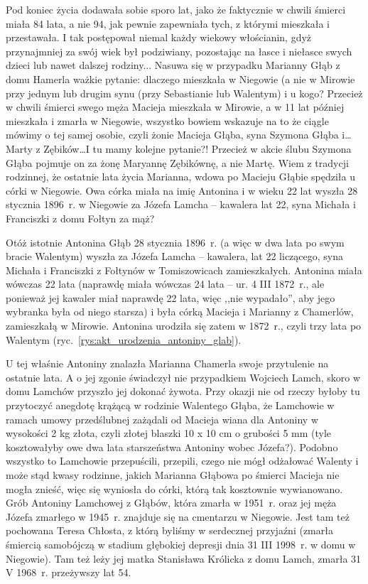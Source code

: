 Pod koniec życia dodawała sobie sporo lat, jako że faktycznie w chwili śmierci miała 84 lata, a nie 94, jak pewnie zapewniała tych, z którymi mieszkała i przestawała. I tak postępował niemal każdy wiekowy włościanin, gdyż przynajmniej za swój wiek był podziwiany, pozostając na łasce i niełasce swych dzieci lub nawet dalszej rodziny... Nasuwa się w przypadku Marianny Głąb z domu Hamerla ważkie pytanie: dlaczego mieszkała w Niegowie (a nie w Mirowie przy jednym lub drugim synu (przy Sebastianie lub Walentym) i u kogo? Przecież w chwili śmierci swego męża Macieja mieszkała w Mirowie, a w 11 lat później mieszkała i zmarła w Niegowie, wszystko bowiem wskazuje na to że ciągle mówimy o tej samej osobie, czyli żonie Macieja Głąba, syna Szymona Głąba i\ldots Marty z Zębików\ldots I tu mamy kolejne pytanie?! Przecież w akcie ślubu Szymona Głąba pojmuje on za żonę Maryannę Zębikównę, a nie Martę. Wiem z tradycji rodzinnej, że ostatnie lata życia Marianna, wdowa po Macieju Głąbie spędziła u córki w Niegowie. Owa córka miała na imię Antonina i w wieku 22 lat wyszła 28 stycznia 1896~r. w Niegowie za Józefa Lamcha -- kawalera lat 22, syna Michała i Franciszki z domu Fołtyn za mąż?


Otóż istotnie Antonina Głąb 28 stycznia 1896~r. (a więc w dwa lata po swym bracie Walentym) wyszła za Józefa Lamcha – kawalera, lat 22 liczącego, syna Michała i Franciszki z Fołtynów w Tomiszowicach zamieszkałych. Antonina miała wówczas 22 lata (naprawdę miała wówczas 24 lata -- ur. 4 III 1872~r., ale ponieważ jej kawaler miał naprawdę 22 lata, więc ,,nie wypadało'', aby jego wybranka była od niego starsza) i była córką Macieja i Marianny z Chamerlów, zamieszkałą w Mirowie. Antonina urodziła się zatem w 1872~r., czyli trzy lata po Walentym (ryc.~\ref{rys:akt_urodzenia_antoniny_glab}).

U tej właśnie Antoniny znalazła Marianna Chamerla swoje przytulenie na ostatnie lata. A o jej zgonie świadczył nie przypadkiem Wojciech Lamch, skoro w domu Lamchów przyszło jej dokonać żywota. 
Przy okazji nie od rzeczy byłoby tu przytoczyć anegdotę krążącą w rodzinie Walentego Głąba, że Lamchowie w ramach umowy przedślubnej zażądali od Macieja wiana dla Antoniny w wysokości 2 kg złota, czyli złotej blaszki 10 x 10 cm o grubości 5 mm (tyle kosztowałyby owe dwa lata starszeństwa Antoniny wobec Józefa?).  Podobno wszystko to Lamchowie przepuścili, przepili, czego nie mógł odżałować Walenty i może stąd kwasy rodzinne, jakich Marianna Głąbowa po śmierci Macieja nie mogła znieść, więc się wyniosła do córki, którą tak kosztownie wywianowano. Grób Antoniny Lamchowej z Głąbów, która zmarła w 1951~r. oraz jej męża Józefa zmarłego w 1945~r. znajduje się na cmentarzu w Niegowie. Jest tam też pochowana Teresa Chłosta, z którą byliśmy w serdecznej przyjaźni (zmarła śmiercią samobójczą w stadium głębokiej depresji dnia 31 III 1998~r. w domu w Niegowie). Tam też leży jej matka Stanisława Królicka z domu Lamch, zmarła 31 V 1968~r. przeżywszy lat 54.


